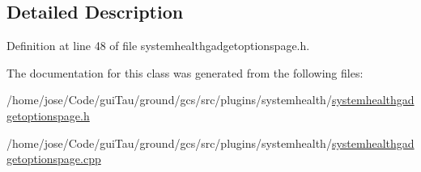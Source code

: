 \subsection{Detailed Description}


Definition at line 48 of file systemhealthgadgetoptionspage.\-h.



The documentation for this class was generated from the following files\-:\begin{DoxyCompactItemize}
\item 
/home/jose/\-Code/gui\-Tau/ground/gcs/src/plugins/systemhealth/\hyperlink{systemhealthgadgetoptionspage_8h}{systemhealthgadgetoptionspage.\-h}\item 
/home/jose/\-Code/gui\-Tau/ground/gcs/src/plugins/systemhealth/\hyperlink{systemhealthgadgetoptionspage_8cpp}{systemhealthgadgetoptionspage.\-cpp}\end{DoxyCompactItemize}
